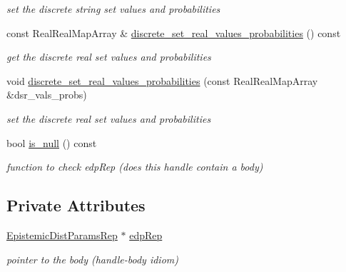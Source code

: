 \begin{DoxyCompactItemize}
\begin{DoxyCompactList}\small\item\em set the discrete string set values and probabilities \end{DoxyCompactList}\item 
const Real\+Real\+Map\+Array \& \hyperlink{classPecos_1_1EpistemicDistParams_a301a5cf39eb4819c0bc02ae9611816fc}{discrete\+\_\+set\+\_\+real\+\_\+values\+\_\+probabilities} () const \label{classPecos_1_1EpistemicDistParams_a301a5cf39eb4819c0bc02ae9611816fc}

\begin{DoxyCompactList}\small\item\em get the discrete real set values and probabilities \end{DoxyCompactList}\item 
void \hyperlink{classPecos_1_1EpistemicDistParams_a5f30869a14a22a36696c6ea5533988ef}{discrete\+\_\+set\+\_\+real\+\_\+values\+\_\+probabilities} (const Real\+Real\+Map\+Array \&dsr\+\_\+vals\+\_\+probs)\label{classPecos_1_1EpistemicDistParams_a5f30869a14a22a36696c6ea5533988ef}

\begin{DoxyCompactList}\small\item\em set the discrete real set values and probabilities \end{DoxyCompactList}\item 
bool \hyperlink{classPecos_1_1EpistemicDistParams_a3c45461717ff230edd665ce24da988c5}{is\+\_\+null} () const \label{classPecos_1_1EpistemicDistParams_a3c45461717ff230edd665ce24da988c5}

\begin{DoxyCompactList}\small\item\em function to check edp\+Rep (does this handle contain a body) \end{DoxyCompactList}\end{DoxyCompactItemize}
\subsection*{Private Attributes}
\begin{DoxyCompactItemize}
\item 
\hyperlink{classPecos_1_1EpistemicDistParamsRep}{Epistemic\+Dist\+Params\+Rep} $\ast$ \hyperlink{classPecos_1_1EpistemicDistParams_a71048d7ae6a93a250f1ba1935a5d002c}{edp\+Rep}\label{classPecos_1_1EpistemicDistParams_a71048d7ae6a93a250f1ba1935a5d002c}

\begin{DoxyCompactList}\small\item\em pointer to the body (handle-\/body idiom) \end{DoxyCompactList}\end{DoxyCompactItemize}


